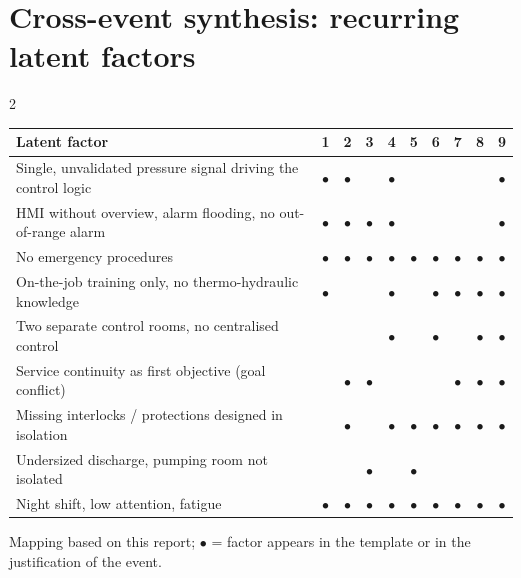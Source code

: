 \clearpage
\section{Cross-event synthesis: recurring latent factors}
\newcommand{\y}{$\bullet$}
\begin{multicols}{2}
\renewcommand{\arraystretch}{1.25}
\begin{tabularx}{\linewidth}{X*{9}{c}}
  \toprule
  \textbf{Latent factor} & \textbf{1} & \textbf{2} & \textbf{3} & \textbf{4} & \textbf{5} & \textbf{6} & \textbf{7} & \textbf{8} & \textbf{9}\\
  \midrule
  Single, unvalidated pressure signal driving the control logic & \y & \y &  & \y &  &  &  &  & \y\\
  HMI without overview, alarm flooding, no out-of-range alarm & \y & \y & \y & \y &  &  &  &  & \y\\
  No emergency procedures & \y & \y & \y & \y & \y & \y & \y & \y & \y\\
  On-the-job training only, no thermo-hydraulic knowledge & \y &  &  & \y &  & \y & \y & \y & \y\\
  Two separate control rooms, no centralised control &  &  &  & \y &  & \y &  & \y & \y\\
  Service continuity as first objective (goal conflict) &  & \y & \y &  &  &  & \y & \y & \y\\
  Missing interlocks / protections designed in isolation &  & \y &  & \y & \y & \y & \y & \y & \y\\
  Undersized discharge, pumping room not isolated &  &  & \y &  & \y &  &  &  & \\
  Night shift, low attention, fatigue & \y & \y & \y & \y & \y & \y & \y & \y & \y\\
  \bottomrule
\end{tabularx}

\vspace{4pt}
{\footnotesize Mapping based on this report; \y{} = factor appears in the template or in the justification of the event.}

\columnbreak

\end{multicols}
